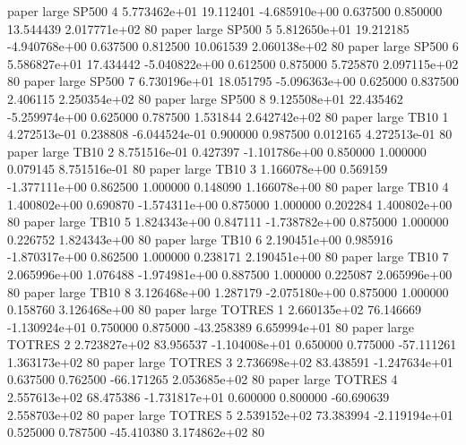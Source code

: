               paper      large    SP500                 4 5.773462e+01     19.112401 -4.685910e+00 0.637500 0.850000      13.544439 2.017771e+02 80
              paper      large    SP500                 5 5.812650e+01     19.212185 -4.940768e+00 0.637500 0.812500      10.061539 2.060138e+02 80
              paper      large    SP500                 6 5.586827e+01     17.434442 -5.040822e+00 0.612500 0.875000       5.725870 2.097115e+02 80
              paper      large    SP500                 7 6.730196e+01     18.051795 -5.096363e+00 0.625000 0.837500       2.406115 2.250354e+02 80
              paper      large    SP500                 8 9.125508e+01     22.435462 -5.259974e+00 0.625000 0.787500       1.531844 2.642742e+02 80
              paper      large     TB10                 1 4.272513e-01      0.238808 -6.044524e-01 0.900000 0.987500       0.012165 4.272513e-01 80
              paper      large     TB10                 2 8.751516e-01      0.427397 -1.101786e+00 0.850000 1.000000       0.079145 8.751516e-01 80
              paper      large     TB10                 3 1.166078e+00      0.569159 -1.377111e+00 0.862500 1.000000       0.148090 1.166078e+00 80
              paper      large     TB10                 4 1.400802e+00      0.690870 -1.574311e+00 0.875000 1.000000       0.202284 1.400802e+00 80
              paper      large     TB10                 5 1.824343e+00      0.847111 -1.738782e+00 0.875000 1.000000       0.226752 1.824343e+00 80
              paper      large     TB10                 6 2.190451e+00      0.985916 -1.870317e+00 0.862500 1.000000       0.238171 2.190451e+00 80
              paper      large     TB10                 7 2.065996e+00      1.076488 -1.974981e+00 0.887500 1.000000       0.225087 2.065996e+00 80
              paper      large     TB10                 8 3.126468e+00      1.287179 -2.075180e+00 0.875000 1.000000       0.158760 3.126468e+00 80
              paper      large   TOTRES                 1 2.660135e+02     76.146669 -1.130924e+01 0.750000 0.875000     -43.258389 6.659994e+01 80
              paper      large   TOTRES                 2 2.723827e+02     83.956537 -1.104008e+01 0.650000 0.775000     -57.111261 1.363173e+02 80
              paper      large   TOTRES                 3 2.736698e+02     83.438591 -1.247634e+01 0.637500 0.762500     -66.171265 2.053685e+02 80
              paper      large   TOTRES                 4 2.557613e+02     68.475386 -1.731817e+01 0.600000 0.800000     -60.690639 2.558703e+02 80
              paper      large   TOTRES                 5 2.539152e+02     73.383994 -2.119194e+01 0.525000 0.787500     -45.410380 3.174862e+02 80
